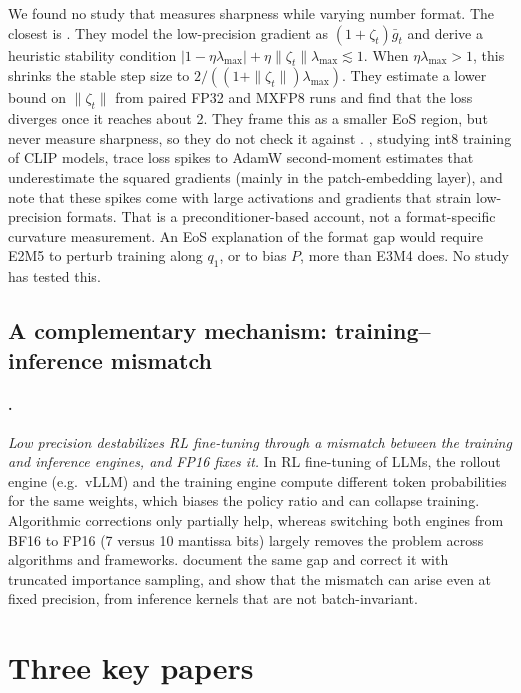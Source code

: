 \documentclass[11pt,letterpaper]{article}
\begin{document}
We found no study that measures sharpness while varying number format. The closest is \citet{Su2025}. They model the low-precision gradient as $(1+\zeta_t)\bar g_t$ and derive a heuristic stability condition $|1-\eta\lambda_{\max}|+\eta\|\zeta_t\|\lambda_{\max}\lesssim1$. When $\eta\lambda_{\max}>1$, this shrinks the stable step size to $2/((1+\|\zeta_t\|)\lambda_{\max})$. They estimate a lower bound on $\|\zeta_t\|$ from paired FP32 and MXFP8 runs and find that the loss diverges once it reaches about 2. They frame this as a smaller EoS region, but never measure sharpness, so they do not check it against \citet{Cohen2021}. \citet{Wortsman2023}, studying int8 training of CLIP models, trace loss spikes to AdamW second-moment estimates that underestimate the squared gradients (mainly in the patch-embedding layer), and note that these spikes come with large activations and gradients that strain low-precision formats. That is a preconditioner-based account, not a format-specific curvature measurement. An EoS explanation of the format gap would require E2M5 to perturb training along $q_1$, or to bias $P$, more than E3M4 does. No study has tested this.

\subsection{A complementary mechanism: training--inference mismatch}

\paragraph{\citet{Qi2025}.}
\emph{Low precision destabilizes RL fine-tuning through a mismatch between the training and inference engines, and FP16 fixes it.} In RL fine-tuning of LLMs, the rollout engine (e.g.\ vLLM) and the training engine compute different token probabilities for the same weights, which biases the policy ratio and can collapse training. Algorithmic corrections only partially help, whereas switching both engines from BF16 to FP16 (7 versus 10 mantissa bits) largely removes the problem across algorithms and frameworks. \citet{Yao2025} document the same gap and correct it with truncated importance sampling, and \citet{He2025} show that the mismatch can arise even at fixed precision, from inference kernels that are not batch-invariant.

\section{Three key papers}
\end{document}
